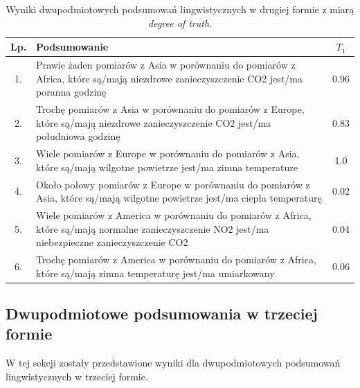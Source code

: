\documentclass{article}
\begin{document}
\begin{table}[H]
\begin{center}
\normalsize %
\begin{tabular}{|c|p{10cm}|c|} %
\hline
\textbf{Lp.} & \textbf{Podsumowanie} & \textbf{\(T_1\)} \\ \hline
1. & Prawie żaden pomiarów z Asia w porównaniu do pomiarów z Africa, które są/mają niezdrowe zanieczyszczenie CO2 jest/ma poranna godzinę & 0.96 \\\hline  
2. & Trochę pomiarów z Asia w porównaniu do pomiarów z Europe, które są/mają niezdrowe zanieczyszczenie CO2 jest/ma południowa godzinę & 0.83 \\\hline 
3. & Wiele pomiarów z Europe w porównaniu do pomiarów z Asia, które są/mają wilgotne powietrze jest/ma zimna temperature & 1.0 \\ \hline 
4. & Około połowy pomiarów z Europe w porównaniu do pomiarów z Asia, które są/mają wilgotne powietrze jest/ma ciepła temperaturę & 0.02 \\ \hline
5. & Wiele pomiarów z America w porównaniu do pomiarów z Africa, które są/mają normalne zanieczyszczenie NO2 jest/ma niebezpieczne zanieczyszczenie CO2 & 0.04 \\ \hline
6. & Trochę pomiarów z America w porównaniu do pomiarów z Africa, które są/mają zimna temperaturę jest/ma umiarkowany & 0.06 \\ \hline 
\end{tabular}
\caption{Wyniki dwupodmiotowych podsumowań lingwistycznych w drugiej formie z miarą \textit{degree of truth}.}
\end{center}
\end{table}

\subsection{Dwupodmiotowe podsumowania w trzeciej formie}
W tej sekcji zostały przedstawione wyniki dla dwupodmiotowych podsumowań lingwistycznych w trzeciej formie.
\end{document}
